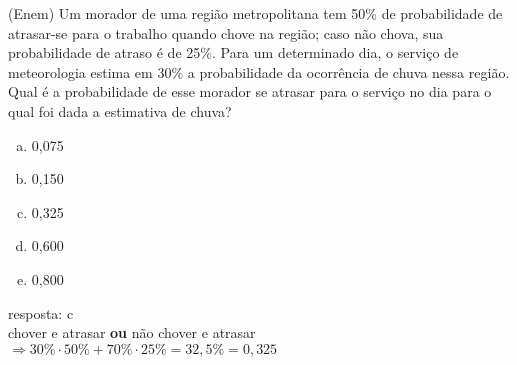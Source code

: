 \begin{ex}
  (Enem) Um morador de uma região metropolitana tem 50\% de probabilidade de atrasar-se para o trabalho quando chove na região; caso não chova, sua probabilidade de atraso é de 25\%. Para um determinado dia, o serviço de meteorologia estima em 30\% a probabilidade da ocorrência de chuva nessa região. Qual é a probabilidade de esse morador se atrasar para o serviço no dia para o qual foi dada a estimativa de chuva?
    \begin{enumerate} [(a)]
        \item 0,075
        \item 0,150
        \item 0,325
        \item 0,600
        \item 0,800
    \end{enumerate}
    \begin{sol}
     resposta: c \\
     chover e atrasar \textbf{ou} não chover e atrasar 
     $\Longrightarrow30\%\cdot50\%+70\%\cdot25\%=32,5\%=0,325$
    \end{sol}
 \end{ex}